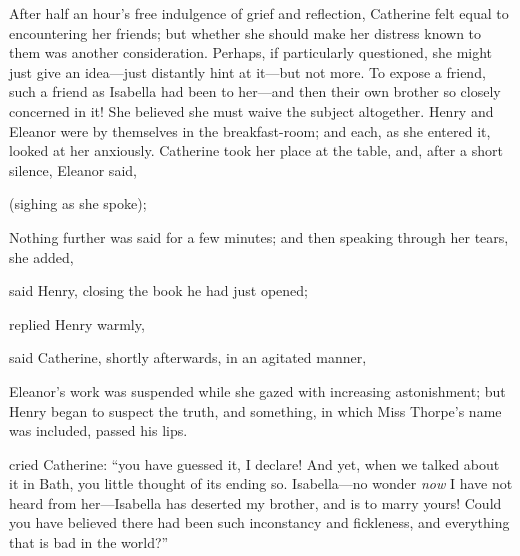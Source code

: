 After half an hour's free indulgence of grief and reflection, Catherine felt equal to encountering her friends; but whether she should make her distress known to them was another consideration. Perhaps, if particularly questioned, she might just give an idea---just distantly hint at it---but not more. To expose a friend, such a friend as Isabella had been to her---and then their own brother so closely concerned in it! She believed she must waive the subject altogether. Henry and Eleanor were by themselves in the breakfast-room; and each, as she entered it, looked at her anxiously. Catherine took her place at the table, and, after a short silence, Eleanor said, 

 (sighing as she spoke); 

Nothing further was said for a few minutes; and then speaking through her tears, she added, 

 said Henry, closing the book he had just opened; 


 replied Henry warmly, 

 said Catherine, shortly afterwards, in an agitated manner, 



Eleanor's work was suspended while she gazed with increasing astonishment; but Henry began to suspect the truth, and something, in which Miss Thorpe's name was included, passed his lips.

 cried Catherine: “you have guessed it, I declare! And yet, when we talked about it in Bath, you little thought of its ending so. Isabella---no wonder {\em now} I have not heard from her---Isabella has deserted my brother, and is to marry yours! Could you have believed there had been such inconstancy and fickleness, and everything that is bad in the world?”

